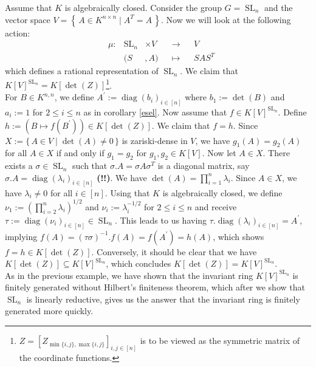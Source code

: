 \begin{dexample}\label{quad}
  Assume that $K$ is algebraically closed.
  Consider the group $G = \operatorname{SL}_n$ and the vector space $ V = \left\{ \, A \in K^{n \times n} \mid A^T = A \, \right\} $.
  Now we will look at the following action:
  \begin{equation}
    \begin{aligned}
      &\mu \colon & \operatorname{SL}_n &\times  V&&  \longrightarrow  &&V \\
      && (  S  &,   A  )  &&\longmapsto&&  SAS^T
    \end{aligned}
  \end{equation}
  which defines a rational representation of $\operatorname{SL}_n$.
  We claim that $K[V]^{\operatorname{SL}_n} = K[\operatorname{det}(Z)]$\footnote{$Z = [Z_{\operatorname{min}\{i,j\},\operatorname{max}\{i,j\}}]_{i,j \in [n]}$ is to be viewed as the symmetric matrix of the coordinate functions.}.  \\
  For $B \in K^{n,n}$, we define $A^\prime := \operatorname{diag}(b_i)_{i\in[n]}$ where $b_1 := \operatorname{det}(B)$ and $a_i := 1$ for $2\leq i\leq n$ as in corollary \ref{esel}.
  Now assume that $f \in K[V]^{\operatorname{SL}_n}$.
  Define $h := (B \mapsto f(B^\prime)) \in K[\operatorname{det}(Z)]$.
  We claim that $f = h$.
  Since $X := \{\, A \in V \mid \operatorname{det}(A) \neq 0 \,\}$ is zariski-dense in $V$, we have $g_1(A) = g_2(A)$ for all $A \in X$ if and only if $g_1 = g_2$ for $g_1,g_2 \in K[V]$.
  Now let $A \in X$.
  There exists a $\sigma \in \operatorname{SL}_n$ such that $\sigma .A = \sigma A \sigma^T$ is a diagonal matrix, say $\sigma.A = \operatorname{diag}(\lambda_i)_{i\in[n]}$ \textbf{(!!)}.
  We have $\operatorname{det}(A) = \prod_{i=1}^n \lambda_i$.
  Since $A \in X$, we have $\lambda_i \neq 0$ for all $i \in [n]$.
  Using that $K$ is algebraically closed, we define $\nu_1 := \left(\prod_{i=2}^n \lambda_i \right)^{1/2}$ and $\nu_i := \lambda_i^{-1/2}$ for $2\leq i\leq n$ and receive $\tau := \operatorname{diag}(\nu_i)_{i\in[n]} \in \operatorname{SL}_n$.
  This leads to us having $\tau.\operatorname{diag}(\lambda_i)_{i\in[n]} = A^\prime$, implying $f(A) = (\tau\sigma)^{-1}.f(A)  = f(A^\prime) = h(A)$, which shows $f = h \in K[\operatorname{det}(Z)]$.
  Conversely, it should be clear that we have $K[\operatorname{det}(Z)] \subseteq K[V]^{\operatorname{SL}_n}$, which concludes $K[\operatorname{det}(Z)] = K[V]^{\operatorname{SL}_n}$.  \\
  As in the previous example, we have shown that the invariant ring $K[V]^{\operatorname{SL}_n}$ is finitely generated without Hilbert's finiteness theorem, which after we show that $\operatorname{SL}_n$ is linearly reductive, gives us the answer that the invariant ring is finitely generated more quickly.
\end{dexample}

